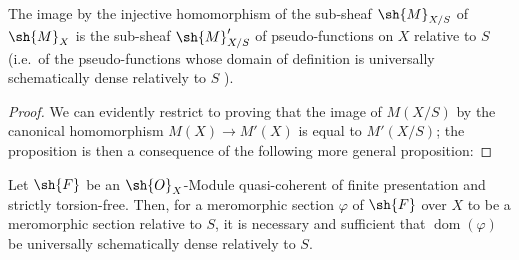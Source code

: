 \begin{proposition}[20.6.3]
\label{IV.20.6.3}
The image by the injective homomorphism  of the sub-sheaf $\sh{M}_{X/S}$ of $\sh{M}_X$ is the sub-sheaf $\sh{M}'_{X/S}$ of pseudo-functions on $X$ relative to $S$ (i.e.\ of the pseudo-functions whose domain of definition is universally schematically dense relatively to $S$ ).
\end{proposition}

\begin{proof}
We can evidently restrict to proving that the image of $M(X/S)$ by the canonical homomorphism $M(X)\to M'(X)$ is equal to $M'(X/S)$;
the proposition is then a consequence of the following more general proposition:
\end{proof}

\begin{proposition}[20.6.4]
\label{IV.20.6.4}
Let $\sh{F}$ be an $\sh{O}_X$-Module quasi-coherent of finite presentation and strictly torsion-free.
Then, for a meromorphic section $\varphi$ of $\sh{F}$ over $X$ to be a meromorphic section relative to $S$, it is necessary and sufficient that $\operatorname{dom}(\varphi)$ be universally schematically dense relatively to $S$.
\end{proposition}

